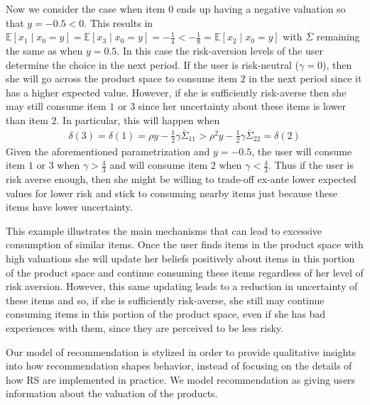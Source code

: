 \documentclass[manuscript]{acmart}
\newcommand{\xhdr}[1]{\vspace{1mm} \noindent{\bf #1}}
\begin{document}
Now we consider the case when item 0 ends up having a negative valuation so that $y = -0.5 < 0$. This results in $\mathbb{E}[x_1\mid x_0=y] = \mathbb{E}[x_3\mid x_0=y] = -\frac{1}{4} <  -\frac{1}{8} = \mathbb{E}[x_2\mid x_0=y]$ with $\bar{\Sigma}$ remaining the same as when $y = 0.5$. In this case the risk-aversion levels of the user determine the choice in the next period. If the user is risk-neutral ($\gamma = 0$), then she will go across the product space to consume item $2$ in the next period since it has a higher expected value. However, if she is sufficiently risk-averse then she may still consume item $1$ or $3$ since her uncertainty about these items is lower than item $2$. In particular, this will happen when 
\begin{align*}
\delta(3) = \delta(1) = \rho y - \frac{1}{2} \gamma \bar{\Sigma}_{11} > \rho^{2} y - \frac{1}{2} \gamma \bar{\Sigma}_{22} = \delta(2)
\end{align*}
Given the aforementioned parametrization and $y = -0.5$, the user will consume item $1$ or $3$ when $\gamma > \frac{4}{3}$ and will consume item $2$ when $\gamma < \frac{4}{3}$. Thus if the user is risk averse enough, then she might be willing to trade-off ex-ante lower expected values for lower risk and stick to consuming nearby items just because these items have lower uncertainty. 
\par 
This example illustrates the main mechanisms that can lead to excessive consumption of similar items. Once the user finds items in the product space with high valuations she will update her beliefs positively about items in this portion of the product space and continue consuming these items regardless of her level of risk aversion. However, this same updating leads to a reduction in uncertainty of these items and so, if she is sufficiently risk-averse, she still may continue consuming items in this portion of the product space, even if she has bad experiences with them, since they are perceived to be less risky. 
\par

\xhdr{Recommendation.}
Our model of recommendation is stylized in order to provide qualitative insights into how recommendation shapes behavior, instead of focusing on the details of how RS are implemented in practice. We model recommendation as giving users information about the valuation of the products.
\par
\end{document}
